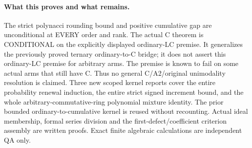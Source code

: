 \paragraph{What this proves and what remains.}
The strict polynacci rounding bound and positive cumulative gap
are unconditional at EVERY order and rank. The actual C theorem
is CONDITIONAL on the explicitly displayed ordinary-LC premise.
It generalizes the previously proved ternary ordinary-to-C bridge;
it does not assert this ordinary-LC premise for arbitrary arms.
The premise is known to fail on some actual arms that still have C.
Thus no general C/A2/original unimodality resolution is claimed.
Three new scoped kernel reports cover the entire probability
renewal induction, the entire strict signed increment bound, and
the whole arbitrary-commutative-ring polynomial mixture identity.
The prior bounded ordinary-to-cumulative kernel is reused without
recounting. Actual ideal membership, formal series division and
the first-defect/coefficient criterion assembly are written proofs.
Exact finite algebraic calculations are independent QA only.

